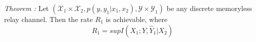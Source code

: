 \documentclass[preview]{standalone}
\begin{document}
\begin{center}
\textit{Theorem :} Let $(\mathscr{X}_1 \times \mathscr{X}_2, p(y,y_1|x_1,x_2),\mathscr{Y} \times \mathscr{Y}_1)$ be any discrete memoryless relay channel. Then the rate $R_1^{}$ is achievable, where \[R_1^{} = supI(X_1;Y,\hat{Y}_1|X_2)\]
\end{center}
\end{document}
